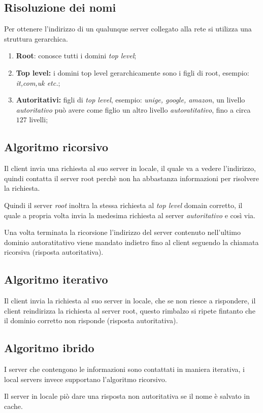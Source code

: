 \subsection{Risoluzione dei nomi}
Per ottenere l'indirizzo di un qualunque server collegato alla rete si
utilizza una struttura gerarchica.

\begin{enumerate}
  \item \textbf{Root}: conosce tutti i domini \emph{top level};
  \item \textbf{Top level:} i domini top level gerarchicamente sono i figli di
    root, esempio: \emph{it,com,uk etc.};
  \item \textbf{Autoritativi:} figli di \emph{top level}, esempio: \emph{unige,
    google, amazon}, un livello \emph{autoritativo} può avere come figlio
    un altro livello \emph{autoratitativo}, fino a circa $127$ livelli;
\end{enumerate}

\subsection{Algoritmo ricorsivo}
Il client invia una richiesta al suo server in locale, il quale va a vedere
l'indirizzo, quindi contatta il server root perchè non ha abbastanza
informazioni per risolvere la richiesta.

Quindi il server \emph{root} inoltra la stessa richiesta al \emph{top level}
domain corretto, il quale a propria volta invia la medesima richiesta al server
\emph{autoritativo} e così via.

Una volta terminata la ricorsione l'indirizzo del server contenuto nell'ultimo
dominio autoratitativo viene mandato indietro fino al client seguendo la
chiamata ricorsiva (risposta autoritativa).

\subsection{Algoritmo iterativo}
Il client invia la richiesta al suo server in locale, che se non riesce a
rispondere, il client reindirizza la richiesta al server root, questo rimbalzo
si ripete fintanto che il dominio corretto non risponde (risposta
autoritativa).

\subsection{Algoritmo ibrido}
I server che contengono le informazioni sono contattati in maniera iterativa,
i local servers invece supportano l'algoritmo ricorsivo.

Il server in locale piò dare una risposta non autoritativa se il nome è
salvato in cache.
